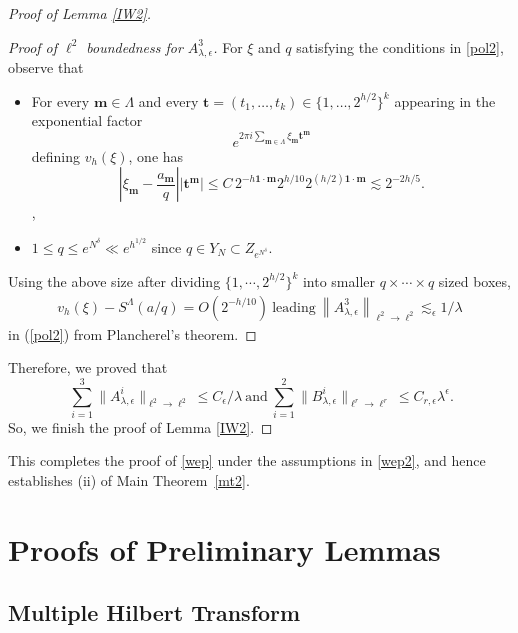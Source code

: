 \documentclass[11 pt,letterpaper]{amsart}
\theoremstyle{plain}
\theoremstyle{definition}
\theoremstyle{remark} \theoremstyle{exam} \theoremstyle{ob}
\numberwithin{equation}{section}
\begin{document}
\begin{proof}[Proof of Lemma \ref{IW2}]
	\begin{proof}[Proof of $\ell^2$ boundedness for $A_{\lambda, \epsilon}^{3}$]
	For $\xi$ and $q$ satisfying the conditions in \eqref{pol2},  observe that \begin{itemize} \item For every $\mathbf{m}\in\Lambda$ and every
		$\mathbf{t}=(t_1,\ldots,t_k)\in\{1,\ldots,2^{h/2}\}^k$
		appearing in the exponential factor
		\[
		e^{2\pi i\sum_{\mathbf{m}\in\Lambda}
			\xi_{\mathbf{m}}\mathbf{t}^{\mathbf{m}}}
		\]
		defining $v_h(\xi)$, one has
		\[
		\left|
		\xi_{\mathbf{m}}-\frac{a_{\mathbf{m}}}{q}
		\right|
		\left|\mathbf{t}^{\mathbf{m}}\right|
		\leq
		C\,2^{-h\mathbf{1}\cdot\mathbf{m}}
		2^{h/10}
		2^{(h/2)\mathbf{1}\cdot\mathbf{m}}
		\lesssim
		2^{-2h/5}.
		\], 
		 \item  $ 1\leq q\leq e^{N^\delta}\ll e^{h^{1/2}} $  since $q\in Y_N\subset Z_{e^{N^\delta}}.$ \end{itemize}	
		Using the above size   after dividing $\{1,\cdots,2^{h/2}\}^k$ into smaller $q\times\cdots\times q$ sized boxes,  \begin{align*} 
			v_{h}(\xi)-S^{\Lambda}(a / q)=O(2^{-h/10})\ \text{leading} \  \left\|A_{\lambda, \epsilon}^{3}\right\|_{\ell^{2} \rightarrow \ell^{2}} \lesssim_{\epsilon}1/\lambda 
		\end{align*}  
in (\ref{pol2})
		from Plancherel's theorem. 
	\end{proof}
	Therefore, we proved that
	$$
	\ \sum_{i=1}^3\|A_{\lambda, \epsilon}^{i}\|_{\ell^2\rightarrow \ell^2}\le  C_{\epsilon} / \lambda\ \text{and}\ \sum_{i=1}^2\| B_{\lambda, \epsilon}^{i} \|_{\ell^r\rightarrow \ell^r}\le   C_{r,\epsilon}\lambda^{\epsilon}. $$
	So, we  finish the proof of Lemma \ref{IW2}.
\end{proof}  

This completes the proof of \eqref{wep} under the assumptions in \eqref{wep2}, and hence establishes (ii) of Main Theorem~\ref{mt2}.


  

 



\section{Proofs of Preliminary Lemmas}\label{PPL}
\subsection{Multiple Hilbert Transform}\label{MHT}
\end{document}
